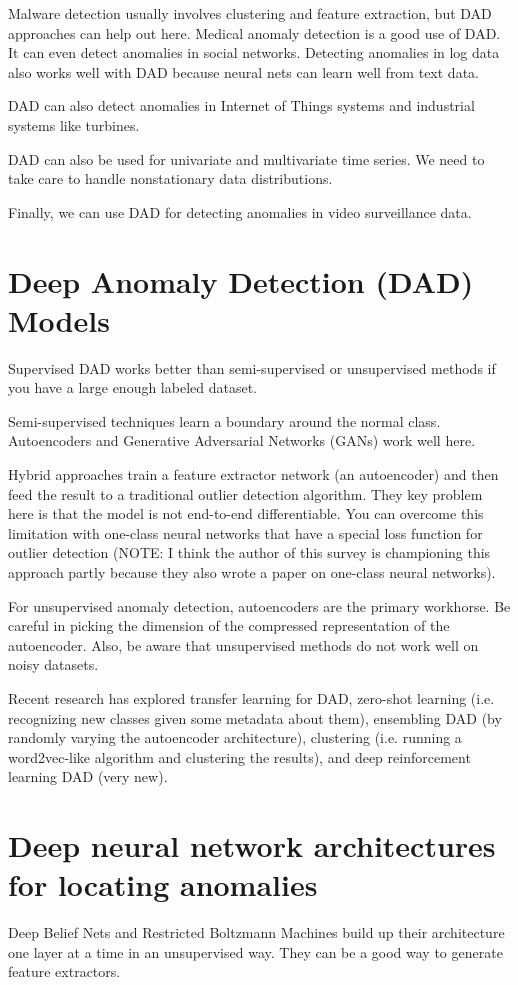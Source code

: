 \documentclass[a4paper]{article}
\begin{document}
Malware detection usually involves clustering and feature extraction, but DAD
approaches can help out here. Medical anomaly detection is a good use of DAD. It
can even detect anomalies in social networks. Detecting anomalies in log data
also works well with DAD because neural nets can learn well from text data.

DAD can also detect anomalies in Internet of Things systems and industrial
systems like turbines.

DAD can also be used for univariate and multivariate time series. We need to take
care to handle nonstationary data distributions.

Finally, we can use DAD for detecting anomalies in video surveillance data.

\section{Deep Anomaly Detection (DAD) Models}
Supervised DAD works better than semi-supervised or unsupervised methods if you
have a large enough labeled dataset.

Semi-supervised techniques learn a boundary around the normal class. Autoencoders
and Generative Adversarial Networks (GANs) work well here.

Hybrid approaches train a feature extractor network (an autoencoder) and then
feed the result to a traditional outlier detection algorithm. They key problem
here is that the model is not end-to-end differentiable. You can overcome this
limitation with one-class neural networks that have a special loss function for
outlier detection (NOTE: I think the author of this survey is championing this
approach partly because they also wrote a paper on one-class neural networks).

For unsupervised anomaly detection, autoencoders are the primary workhorse.
Be careful in picking the dimension of the compressed representation of the
autoencoder. Also, be aware that unsupervised methods do not work well on
noisy datasets.

Recent research has explored transfer learning for DAD, zero-shot learning
(i.e. recognizing new classes given some metadata about them), ensembling
DAD (by randomly varying the autoencoder architecture), clustering (i.e.
running a word2vec-like algorithm and clustering the results), and deep
reinforcement learning DAD (very new).

\section{Deep neural network architectures for locating anomalies}
Deep Belief Nets and Restricted Boltzmann Machines build up their architecture
one layer at a time in an unsupervised way. They can be a good way to generate
feature extractors.
\end{document}
